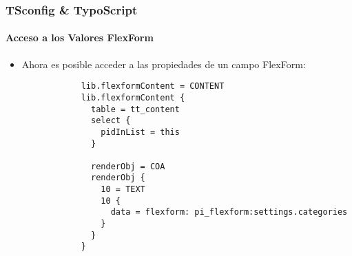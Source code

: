\begin{frame}[fragile]
	\frametitle{TSconfig \& TypoScript}
	\framesubtitle{Acceso a los Valores FlexForm}

	\lstset{basicstyle=\tiny\ttfamily}

	\begin{itemize}

		\item Ahora es posible acceder a las propiedades de un campo FlexForm:

		\begin{lstlisting}
			lib.flexformContent = CONTENT
			lib.flexformContent {
			  table = tt_content
			  select {
			    pidInList = this
			  }

			  renderObj = COA
			  renderObj {
			    10 = TEXT
			    10 {
			      data = flexform: pi_flexform:settings.categories
			    }
			  }
			}
		\end{lstlisting}

	\end{itemize}

\end{frame}

